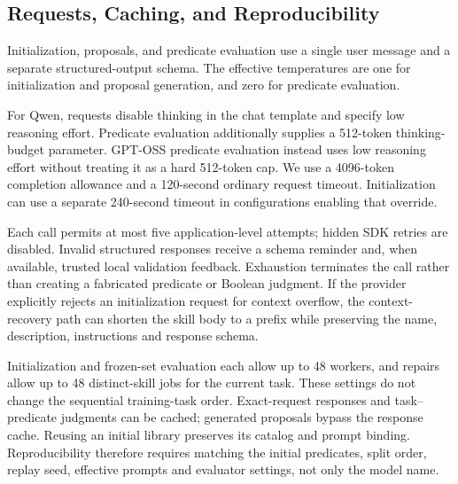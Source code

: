 \subsection{Requests, Caching, and Reproducibility}
\label{app:implementation-runtime}
Initialization, proposals, and predicate evaluation use a single user message and a separate structured-output schema. The effective temperatures are one for initialization and proposal generation, and zero for predicate evaluation.

For Qwen, requests disable thinking in the chat template and specify low reasoning effort. Predicate evaluation additionally supplies a 512-token thinking-budget parameter. GPT-OSS predicate evaluation instead uses low reasoning effort without treating it as a hard 512-token cap. We use a 4096-token completion allowance and a 120-second ordinary request timeout. Initialization can use a separate 240-second timeout in configurations enabling that override.

Each call permits at most five application-level attempts; hidden SDK retries are disabled. Invalid structured responses receive a schema reminder and, when available, trusted local validation feedback. Exhaustion terminates the call rather than creating a fabricated predicate or Boolean judgment. If the provider explicitly rejects an initialization request for context overflow, the context-recovery path can shorten the skill body to a prefix while preserving the name, description, instructions and response schema.

Initialization and frozen-set evaluation each allow up to 48 workers, and repairs allow up to 48 distinct-skill jobs for the current task. These settings do not change the sequential training-task order. Exact-request responses and task--predicate judgments can be cached; generated proposals bypass the response cache. Reusing an initial library preserves its catalog and prompt binding. Reproducibility therefore requires matching the initial predicates, split order, replay seed, effective prompts and evaluator settings, not only the model name.
